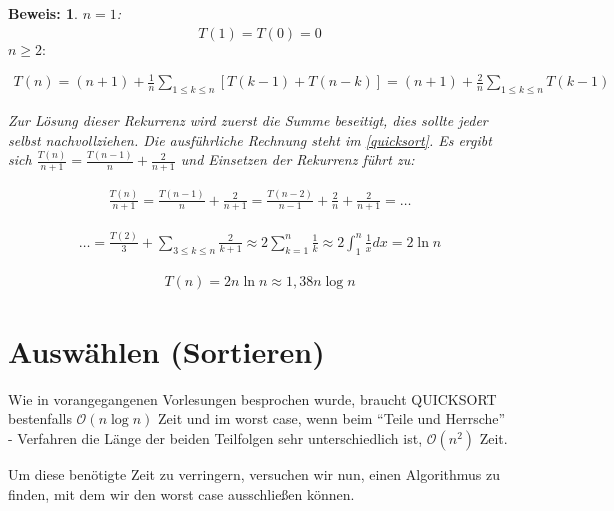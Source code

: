 \documentclass[ngerman,draft,parskip=half*,twoside]{scrreprt}
\theoremstyle{break}
\theoremstyle{nonumberbreak}
\newtheorem{beweis}{Beweis:}
\newcommand*{\OO}{\mathcal{O}}      %
\begin{document}
\begin{beweis}
$n=1$:
\begin{gather*}
T(1)=T(0)=0
\end{gather*}
$n \geq 2:$

\begin{gather*}
T(n)=(n+1)+ \frac{1}{n}\sum_{1\leq k\leq n}[T(k-1)+ T(n-k)]= (n+1)+ \frac{2}{n} \sum_{1\leq k\leq n}T(k-1)
\end{gather*}

Zur Lösung dieser Rekurrenz wird zuerst die Summe beseitigt, dies sollte jeder selbst nachvollziehen.
Die ausführliche Rechnung steht im \autoref{quicksort}. Es ergibt sich $\frac{T(n)}{n+1}= \frac{T(n-1)}{n}+ \frac{2}{n+1}$ und
Einsetzen der Rekurrenz führt zu:


\begin{gather*}
\frac{T(n)}{n+1}= \frac{T(n-1)}{n}+ \frac{2}{n+1}=\frac{T(n-2)}{n-1}+\frac{2}{n}+\frac{2}{n+1}=\ldots
\end{gather*}

\begin{gather*}
\ldots= \frac{T(2)}{3}+ \sum_{3\leq k \leq n}\frac{2}{k+1} \approx 2\sum_{k=1}^{n}\frac{1}{k}\approx 2
\int_{1}^{n}\frac{1}{x} dx =2 \ln n
\end{gather*}

\begin{gather*}
T(n)=2n  \ln n \approx 1,38 n   \log n
\end{gather*}
\end{beweis}

 \section{Auswählen (Sortieren)}
 Wie in vorangegangenen Vorlesungen besprochen wurde, braucht \textsc{QUICKSORT} bestenfalls $\OO(n \log n)$ Zeit und im
 worst case, wenn beim "`Teile und Herrsche"' - Verfahren die Länge der beiden Teilfolgen sehr unterschiedlich ist, $\OO(n^{2})$ Zeit.

 Um diese benötigte Zeit zu verringern, versuchen wir nun, einen Algorithmus zu finden, mit dem wir den worst case ausschließen
 können.
\end{document}
